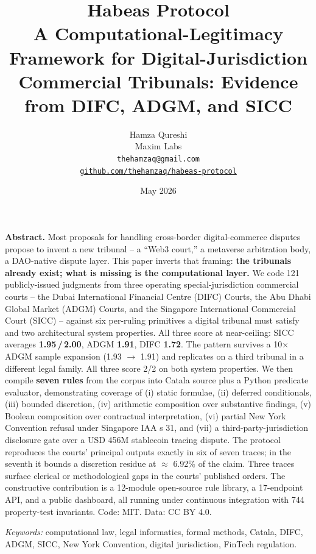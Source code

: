 \documentclass[11pt,letterpaper]{article}
\title{
  \vspace{-2em}
  \LARGE\bfseries\color{ink}
  Habeas Protocol\\[0.4em]
  \large\normalfont\color{ink2}
  A Computational-Legitimacy Framework for Digital-Jurisdiction\\
  Commercial Tribunals: Evidence from DIFC, ADGM, and SICC
}
\author{
  Hamza Qureshi\\
  \small Maxim Labs\\
  \small \texttt{thehamzaq@gmail.com}\\
  \small \href{https://github.com/thehamzaq/habeas-protocol}{\texttt{github.com/thehamzaq/habeas-protocol}}
}
\date{May 2026}
\begin{document}
\maketitle

\begin{callout}
\noindent\textbf{Abstract.}
Most proposals for handling cross-border digital-commerce disputes propose to invent a new tribunal -- a ``Web3 court,'' a metaverse arbitration body, a DAO-native dispute layer. This paper inverts that framing: \textbf{the tribunals already exist; what is missing is the computational layer.} We code 121 publicly-issued judgments from three operating special-jurisdiction commercial courts -- the Dubai International Financial Centre (DIFC) Courts, the Abu Dhabi Global Market (ADGM) Courts, and the Singapore International Commercial Court (SICC) -- against six per-ruling primitives a digital tribunal must satisfy and two architectural system properties. All three score at near-ceiling: SICC averages \textbf{1.95\,/\,2.00}, ADGM \textbf{1.91}, DIFC \textbf{1.72}. The pattern survives a 10$\times$ ADGM sample expansion (1.93 $\to$ 1.91) and replicates on a third tribunal in a different legal family. All three score 2/2 on both system properties. We then compile \textbf{seven rules} from the corpus into Catala source plus a Python predicate evaluator, demonstrating coverage of (i) static formulae, (ii) deferred conditionals, (iii) bounded discretion, (iv) arithmetic composition over substantive findings, (v) Boolean composition over contractual interpretation, (vi) partial New York Convention refusal under Singapore IAA s 31, and (vii) a third-party-jurisdiction disclosure gate over a USD 456M stablecoin tracing dispute. The protocol reproduces the courts' principal outputs exactly in six of seven traces; in the seventh it bounds a discretion residue at $\approx$ 6.92\% of the claim. Three traces surface clerical or methodological gaps in the courts' published orders. The constructive contribution is a 12-module open-source rule library, a 17-endpoint API, and a public dashboard, all running under continuous integration with 744 property-test invariants. Code: MIT. Data: CC BY 4.0.
\end{callout}

\vspace{0.5em}
\noindent\small\textit{Keywords:} computational law, legal informatics, formal methods, Catala, DIFC, ADGM, SICC, New York Convention, digital jurisdiction, FinTech regulation.
\end{document}
